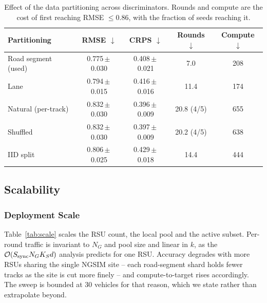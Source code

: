 \documentclass[journal]{IEEEtran}
\begin{document}
\begin{table}[!t]
\centering
\caption{Effect of the data partitioning across discriminators. Rounds and
compute are the cost of first reaching RMSE $\le0.86$, with the fraction of
seeds reaching it.}
\label{tab:partition}
\footnotesize
\begin{tabular}{lcccc}
\toprule
Partitioning & RMSE $\downarrow$ & CRPS $\downarrow$ & Rounds $\downarrow$ & Compute $\downarrow$ \\
\midrule
Road segment (used) & 0.775\,$\pm$\,0.030 & 0.408\,$\pm$\,0.021 & 7.0 & 208 \\
Lane & 0.794\,$\pm$\,0.015 & 0.416\,$\pm$\,0.016 & 11.4 & 174 \\
Natural (per-track) & 0.832\,$\pm$\,0.030 & 0.396\,$\pm$\,0.009 & 20.8 (4/5) & 655 \\
Shuffled & 0.832\,$\pm$\,0.030 & 0.397\,$\pm$\,0.009 & 20.2 (4/5) & 638 \\
IID split & 0.806\,$\pm$\,0.025 & 0.429\,$\pm$\,0.018 & 14.4 & 444 \\
\bottomrule
\end{tabular}
\end{table}

\subsection{Scalability}
\label{sec:scalability}
\subsubsection{Deployment Scale}
Table~\ref{tab:scale} scales the RSU count, the local pool and the active
subset. Per-round traffic is invariant to $N_G$ and pool size and linear in
$k$, as the $\mathcal{O}(S_{\rm sync}N_GK_Sd)$ analysis predicts for one RSU.
Accuracy degrades with more RSUs sharing the single NGSIM site -- each
road-segment shard holds fewer tracks as the site is cut more finely -- and
compute-to-target rises accordingly. The sweep is bounded at 30 vehicles for
that reason, which we state rather than extrapolate beyond.
\end{document}
